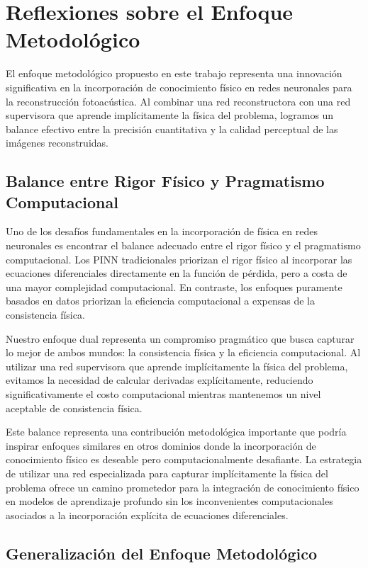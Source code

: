 \section{Reflexiones sobre el Enfoque Metodológico}

El enfoque metodológico propuesto en este trabajo representa una innovación significativa en la incorporación de conocimiento físico en redes neuronales para la reconstrucción fotoacústica. Al combinar una red reconstructora con una red supervisora que aprende implícitamente la física del problema, logramos un balance efectivo entre la precisión cuantitativa y la calidad perceptual de las imágenes reconstruidas.

\subsection{Balance entre Rigor Físico y Pragmatismo Computacional}

Uno de los desafíos fundamentales en la incorporación de física en redes neuronales es encontrar el balance adecuado entre el rigor físico y el pragmatismo computacional. Los PINN tradicionales priorizan el rigor físico al incorporar las ecuaciones diferenciales directamente en la función de pérdida, pero a costa de una mayor complejidad computacional. En contraste, los enfoques puramente basados en datos priorizan la eficiencia computacional a expensas de la consistencia física.

Nuestro enfoque dual representa un compromiso pragmático que busca capturar lo mejor de ambos mundos: la consistencia física y la eficiencia computacional. Al utilizar una red supervisora que aprende implícitamente la física del problema, evitamos la necesidad de calcular derivadas explícitamente, reduciendo significativamente el costo computacional mientras mantenemos un nivel aceptable de consistencia física.

Este balance representa una contribución metodológica importante que podría inspirar enfoques similares en otros dominios donde la incorporación de conocimiento físico es deseable pero computacionalmente desafiante. La estrategia de utilizar una red especializada para capturar implícitamente la física del problema ofrece un camino prometedor para la integración de conocimiento físico en modelos de aprendizaje profundo sin los inconvenientes computacionales asociados a la incorporación explícita de ecuaciones diferenciales.

\subsection{Generalización del Enfoque Metodológico}

